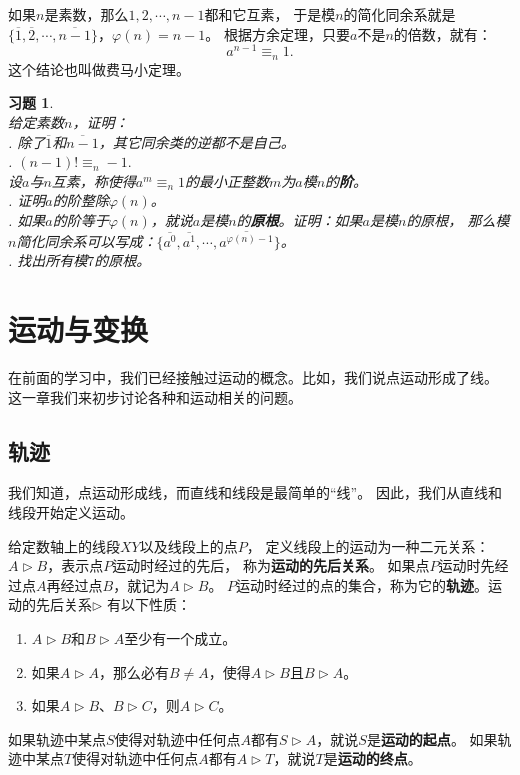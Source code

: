 \documentclass[12pt,UTF8]{ctexbook}
\newtheorem{xt}{习题}[section]
\begin{document}
如果$n$是素数，那么$1,2, \cdots , n-1$都和它互素，
于是模$n$的简化同余系就是$\{\overline{1},\overline{2}, \cdots , \overline{n-1}\}$，$\varphi(n) = n-1$。
根据方余定理，只要$a$不是$n$的倍数，就有：
$$ a^{n-1} \equiv_n 1 .$$
这个结论也叫做费马小定理。

\begin{xt}\label{xt:4-3-0}
    \mbox{}\\
    给定素数$n$，证明：\\
    . 除了$\overline{1}$和$\overline{n-1}$，其它同余类的逆都不是自己。\\
    . $(n-1)! \equiv_n -1.$ \\
    设$a$与$n$互素，称使得$a^m \equiv_n 1$的最小正整数$m$为$a$模$n$的\textbf{阶}。\\
    . 证明$a$的阶整除$\varphi(n)$。\\
    . 如果$a$的阶等于$\varphi(n)$，就说$a$是模$n$的\textbf{原根}。证明：如果$a$是模$n$的原根，
    那么模$n$简化同余系可以写成：$\{\overline{a^0}, \overline{a^1}, \cdots , \overline{a^{\varphi(n)-1}}\}$。\\
    . 找出所有模$7$的原根。
\end{xt}

\chapter{运动与变换}
在前面的学习中，我们已经接触过运动的概念。比如，我们说点运动形成了线。
这一章我们来初步讨论各种和运动相关的问题。

\section{轨迹}
我们知道，点运动形成线，而直线和线段是最简单的“线”。
因此，我们从直线和线段开始定义运动。

给定数轴上的线段$XY$以及线段上的点$P$，
定义线段上的运动为一种二元关系：$A \triangleright B$，表示点$P$运动时经过的先后，
称为\textbf{运动的先后关系}。
如果点$P$运动时先经过点$A$再经过点$B$，就记为$A \triangleright B$。
$P$运动时经过的点的集合，称为它的\textbf{轨迹}。运动的先后关系$\triangleright$
有以下性质：
\begin{enumerate}
    \item $A \triangleright B$和$B \triangleright A$至少有一个成立。
    \item 如果$A \triangleright A$，那么必有$B\neq A$，使得$A \triangleright B$且$B \triangleright A$。
    \item 如果$A \triangleright B$、$B \triangleright C$，则$A \triangleright C$。
\end{enumerate}
如果轨迹中某点$S$使得对轨迹中任何点$A$都有$S \triangleright A$，就说$S$是\textbf{运动的起点}。
如果轨迹中某点$T$使得对轨迹中任何点$A$都有$A \triangleright T$，就说$T$是\textbf{运动的终点}。
\end{document}
